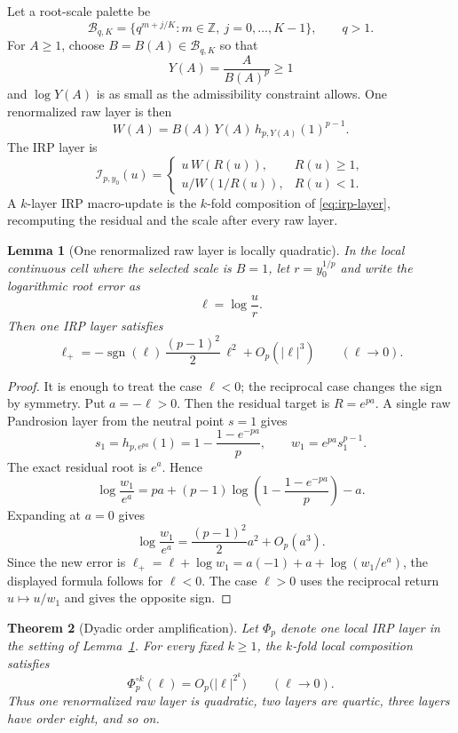 \documentclass[10pt,a4paper]{article}
\theoremstyle{plain}
\newtheorem{theorem}{Theorem}[section]
\newtheorem{lemma}[theorem]{Lemma}
\theoremstyle{definition}
\theoremstyle{remark}
\newcommand{\IRP}{\mathcal I}
\begin{document}
Let a root-scale palette be
\[
  \mathcal B_{q,K}=\{q^{m+j/K}:m\in\mathbb Z,
  \ j=0,\ldots,K-1\},\qquad q>1.
\]
For $A\ge1$, choose $B=B(A)\in\mathcal B_{q,K}$ so that
\[
  Y(A)=\frac{A}{B(A)^p}\ge1
\]
and $\log Y(A)$ is as small as the admissibility constraint allows.  One
renormalized raw layer is then
\[
  W(A)=B(A)\,Y(A)\,h_{p,Y(A)}(1)^{p-1}.
\]
The IRP layer is
\begin{equation}
  \IRP_{p,y_0}(u)=
  \begin{cases}
    u\,W(R(u)), & R(u)\ge1,\\[0.35em]
    u/W(1/R(u)), & R(u)<1.
  \end{cases}
  \label{eq:irp-layer}
\end{equation}
A $k$-layer IRP macro-update is the $k$-fold composition of
\eqref{eq:irp-layer}, recomputing the residual and the scale after every raw
layer.

\begin{lemma}[One renormalized raw layer is locally quadratic]
\label{lem:irp-one-layer}
In the local continuous cell where the selected scale is $B=1$, let
$r=y_0^{1/p}$ and write the logarithmic root error as
\[
  \ell=\log\frac{u}{r}.
\]
Then one IRP layer satisfies
\begin{equation}
  \ell_+
  =-\operatorname{sgn}(\ell)\,\frac{(p-1)^2}{2}\,\ell^2
  +O_p(|\ell|^3)
  \qquad (\ell\to0).
  \label{eq:irp-quadratic-layer}
\end{equation}
\end{lemma}

\begin{proof}
It is enough to treat the case $\ell<0$; the reciprocal case changes the sign
by symmetry.  Put $a=-\ell>0$.  Then the residual target is
$R=e^{pa}$.  A single raw Pandrosion layer from the neutral point $s=1$ gives
\[
  s_1=h_{p,e^{pa}}(1)=1-\frac{1-e^{-pa}}{p},
  \qquad
  w_1=e^{pa}s_1^{p-1}.
\]
The exact residual root is $e^a$.  Hence
\[
  \log\frac{w_1}{e^a}
  =pa+(p-1)\log\left(1-\frac{1-e^{-pa}}{p}\right)-a.
\]
Expanding at $a=0$ gives
\[
  \log\frac{w_1}{e^a}
  =\frac{(p-1)^2}{2}a^2+O_p(a^3).
\]
Since the new error is $\ell_+=\ell+\log w_1=a(-1)+a+
\log(w_1/e^a)$, the displayed formula follows for $\ell<0$.  The case
$\ell>0$ uses the reciprocal return $u\mapsto u/w_1$ and gives the opposite
sign.
\end{proof}

\begin{theorem}[Dyadic order amplification]
\label{thm:irp-dyadic}
Let $\Phi_p$ denote one local IRP layer in the setting of
Lemma~\ref{lem:irp-one-layer}.  For every fixed $k\ge1$, the $k$-fold local
composition satisfies
\[
  \Phi_p^{\circ k}(\ell)=O_p\bigl(|\ell|^{2^k}\bigr)
  \qquad (\ell\to0).
\]
Thus one renormalized raw layer is quadratic, two layers are quartic, three
layers have order eight, and so on.
\end{theorem}
\end{document}
